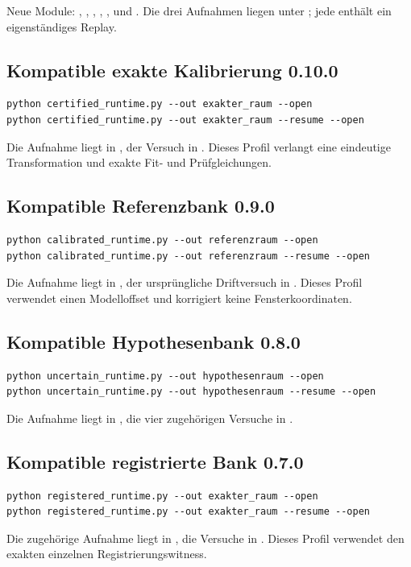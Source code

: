 \documentclass[11pt,a4paper]{article}
\begin{document}
Neue Module: , ,
, ,
,  und
. Die drei Aufnahmen liegen unter
; jede enthält ein eigenständiges Replay.

\clearpage\subsection{Kompatible exakte Kalibrierung 0.10.0}
\begin{lstlisting}
python certified_runtime.py --out exakter_raum --open
python certified_runtime.py --out exakter_raum --resume --open
\end{lstlisting}
Die Aufnahme liegt in , der Versuch in
. Dieses Profil verlangt eine eindeutige
Transformation und exakte Fit- und Prüfgleichungen.

\subsection{Kompatible Referenzbank 0.9.0}
\begin{lstlisting}
python calibrated_runtime.py --out referenzraum --open
python calibrated_runtime.py --out referenzraum --resume --open
\end{lstlisting}
Die Aufnahme liegt in , der ursprüngliche
Driftversuch in . Dieses Profil verwendet
einen Modelloffset und korrigiert keine Fensterkoordinaten.

\subsection{Kompatible Hypothesenbank 0.8.0}
\begin{lstlisting}
python uncertain_runtime.py --out hypothesenraum --open
python uncertain_runtime.py --out hypothesenraum --resume --open
\end{lstlisting}
Die Aufnahme liegt in , die vier
zugehörigen Versuche in .

\subsection{Kompatible registrierte Bank 0.7.0}
\begin{lstlisting}
python registered_runtime.py --out exakter_raum --open
python registered_runtime.py --out exakter_raum --resume --open
\end{lstlisting}
Die zugehörige Aufnahme liegt in ,
die Versuche in . Dieses Profil
verwendet den exakten einzelnen Registrierungswitness.
\end{document}
